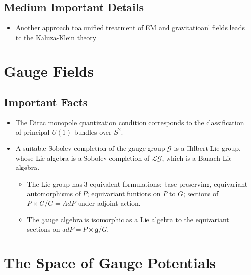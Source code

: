 \subsection{Medium Important Details}
\begin{itemize}
    \item Another approach toa  unified treatment of EM and gravitatioanl fields leads to the Kaluza-Klein theory
\end{itemize}
\section{Gauge Fields}

\subsection{Important Facts}
\begin{itemize}
    \item The Dirac monopole quantization condition corresponds to the classification of principal $U(1)$-bundles over $S^2$.
    
    \item A suitable Sobolev completion of the gauge group $\mathcal G$ is a Hilbert Lie group, whose Lie algebra is a Sobolev completion of $\mathcal{LG}$, which is a Banach Lie algebra.
    \begin{itemize}
        \item The Lie group has $3$ equivalent formulations: base preserving, equivariant automorphisms of $P$; equivariant funtions on $P$ to $G$; sections of $P \times G / G = Ad P$ under adjoint action.
        
        \item The gauge algebra is isomorphic as a Lie algebra to the equivariant sections on $ad P = P \times \mathfrak g / G$.
    \end{itemize}
\end{itemize}

\section{The Space of Gauge Potentials}

